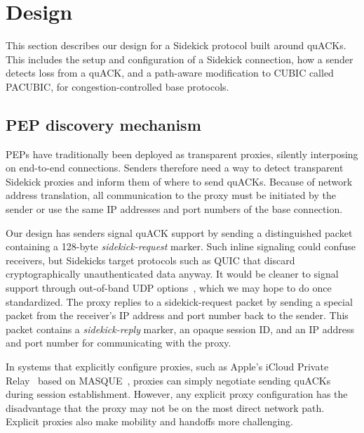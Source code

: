\section{Design}
\label{sec:sidekick:design}

This section describes our design for a Sidekick protocol built around
quACKs. This includes the setup and configuration of a Sidekick
connection, how a sender detects loss from a quACK, and a path-aware
modification to CUBIC called PACUBIC, for congestion-controlled base
protocols.


\subsection{PEP discovery mechanism}
\label{sec:sidekick:design:discovery}

PEPs have traditionally been deployed as transparent proxies, silently
interposing on end-to-end connections. Senders therefore need a way to detect
transparent Sidekick proxies and inform them of where to send quACKs.  Because
of network address translation, all communication to the proxy must be
initiated by the sender or use the same IP addresses and port numbers of the
base connection.

Our design has senders signal quACK support by sending a
distinguished packet containing a 128-byte \emph{sidekick-request} marker.
Such inline signaling could confuse receivers, but Sidekicks target protocols
such as QUIC that discard cryptographically unauthenticated data anyway.  It
would be cleaner to signal support through out-of-band UDP options~\cite
{ietf-tsvwg-udp-options-28}, which we may hope to do once standardized.
The proxy replies to a sidekick-request packet by sending a special packet from
the receiver's IP address and port number back to the sender. This packet
contains a \emph{sidekick-reply} marker, an opaque session ID, and an IP
address and port number for communicating with the proxy.

In systems that explicitly configure proxies, such as Apple's iCloud Private
Relay~\cite{icloud-private-relay} based on MASQUE~\cite
{kosek2021masque,kramer2021masquepep}, proxies can simply negotiate sending
quACKs during session establishment. However, any explicit proxy configuration
has the disadvantage that the proxy may not be on the most direct network path.
Explicit proxies also make mobility and handoffs more challenging.

